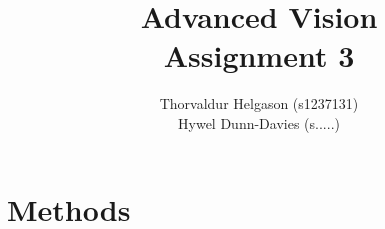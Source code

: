 \documentclass[a4paper,12pt]{article}
\title{Advanced Vision\\Assignment 3}
\author{Thorvaldur Helgason (s1237131)\\Hywel Dunn-Davies (s.....)}
\begin{document}
    
\maketitle



\section{Methods}














\end{document}
